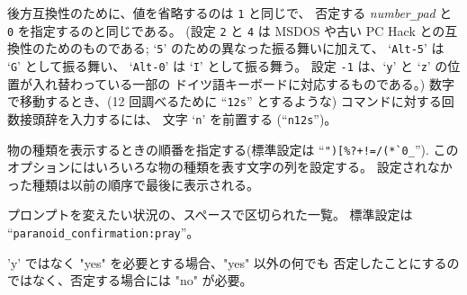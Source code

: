 後方互換性のために、値を省略するのは {\tt 1} と同じで、
否定する {\it number\verb+_+pad\/} と {\tt 0} を指定するのと同じである。
(設定 {\tt 2} と {\tt 4} は MSDOS や古い PC Hack との互換性のためのものである;
`{\tt 5}' のための異なった振る舞いに加えて、
`{\tt Alt-5}' は `{\tt G}' として振る舞い、
`{\tt Alt-0}' は `{\tt I}' として振る舞う。
設定 {\tt -1} は、`{\tt y}' と `{\tt z}' の位置が入れ替わっている一部の
ドイツ語キーボードに対応するものである。)
数字で移動するとき、(12 回調べるために ``{\tt 12s}'' とするような)
コマンドに対する回数接頭辞を入力するには、
文字 `{\tt n}' を前置する (``{\tt n12s}'')。
\item[\ib{packorder}]
物の種類を表示するときの順番を指定する(標準設定は
``\verb&")[%?+!=/(*`0_&'').
このオプションにはいろいろな物の種類を表す文字の列を設定する。
設定されなかった種類は以前の順序で最後に表示される。
\item[\ib{paranoid\verb+_+confirmation}]
プロンプトを変えたい状況の、スペースで区切られた一覧。
標準設定は ``{\tt paranoid_confirmation:pray}''。
\newlength{\pcwidth}
\settowidth{\pcwidth}{\tt Confirm}
\addtolength{\pcwidth}{\labelsep}
\blist{\leftmargin \pcwidth \topsep 1mm \itemsep 0mm}
\item[{\tt Confirm}]
'y' ではなく "yes" を必要とする場合、"yes" 以外の何でも
否定したことにするのではなく、否定する場合には "no" が必要。
\item[{\tt quit~~~}]
